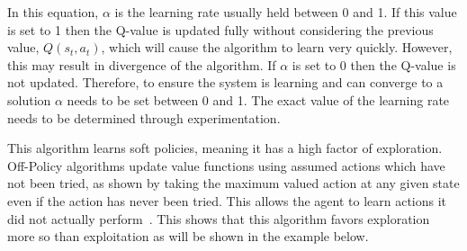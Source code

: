 \documentclass[12pt,american]{report}
\begin{document}
In this equation, \textit{$\alpha$} is the learning rate usually held between 0 and 1.  If this value is set to 1 then the Q-value is updated fully without considering the previous value, \textit{$Q(s_t,a_t)$}, which will cause the algorithm to learn very quickly. However, this may result in divergence of the algorithm.  If \textit{$\alpha$} is set to 0 then the Q-value is not updated.  Therefore, to ensure the system is learning and can converge to a solution \textit{$\alpha$} needs to be set between 0 and 1. The exact value of the learning rate needs to be determined through experimentation.
        
This algorithm learns soft policies, meaning it has a high factor of exploration. Off-Policy algorithms update value functions using assumed actions which have not been tried, as shown by taking the maximum valued action at any given state even if the action has never been tried.  This allows the agent to learn actions it did not actually perform~\cite{Eden}. This shows that this algorithm favors exploration more so than exploitation as will be shown in the example below.  
\end{document}
